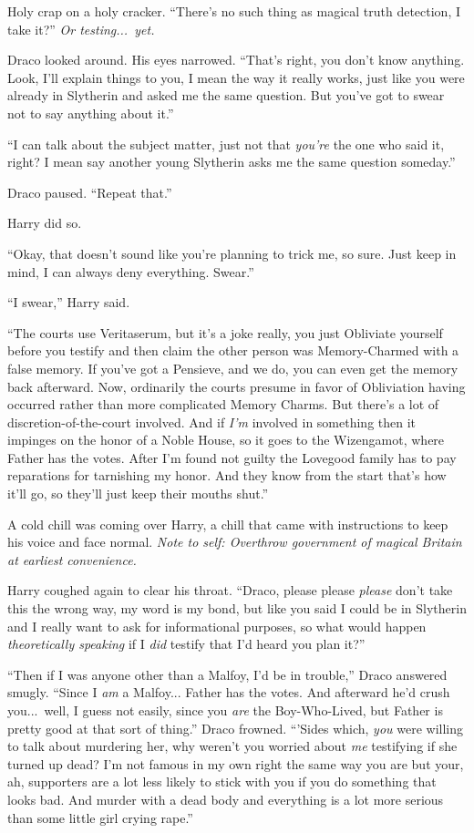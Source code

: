 Holy crap on a holy cracker. “There’s no such thing as magical truth detection, I take it?” \emph{Or  testing...\ yet.}

Draco looked around. His eyes narrowed. “That’s right, you don’t know anything. Look, I’ll explain things to you, I mean the way it really works, just like you were already in Slytherin and asked me the same question. But you’ve got to swear not to say anything about it.”

“I can talk about the subject matter, just not that \emph{you’re} the one who said it, right? I mean say another young Slytherin asks me the same question someday.”

Draco paused. “Repeat that.”

Harry did so.

“Okay, that doesn’t sound like you’re planning to trick me, so sure. Just keep in mind, I can always deny everything. Swear.”

“I swear,” Harry said.

“The courts use Veritaserum, but it’s a joke really, you just Obliviate yourself before you testify and then claim the other person was Memory-Charmed with a false memory. If you’ve got a Pensieve, and we do, you can even get the memory back afterward. Now, ordinarily the courts presume in favor of Obliviation having occurred rather than more complicated Memory Charms. But there’s a lot of discretion-of-the-court involved. And if \emph{I’m} involved in something then it impinges on the honor of a Noble House, so it goes to the Wizengamot, where Father has the votes. After I’m found not guilty the Lovegood family has to pay reparations for tarnishing my honor. And they know from the start that’s how it’ll go, so they’ll just keep their mouths shut.”

A cold chill was coming over Harry, a chill that came with instructions to keep his voice and face normal. \emph{Note to self: Overthrow government of magical Britain at earliest convenience.}

Harry coughed again to clear his throat. “Draco, please please \emph{please} don’t take this the wrong way, my word is my bond, but like you said I could be in Slytherin and I really want to ask for informational purposes, so what would happen \emph{theoretically speaking} if I \emph{did} testify that I’d heard you plan it?”

“Then if I was anyone other than a Malfoy, I’d be in trouble,” Draco answered smugly. “Since I \emph{am} a Malfoy... Father has the votes. And afterward he’d crush you...\ well, I guess not easily, since you \emph{are} the Boy-Who-Lived, but Father is pretty good at that sort of thing.” Draco frowned. “’Sides which, \emph{you} were willing to talk about murdering her, why weren’t you worried about \emph{me} testifying if she turned up dead? I’m not famous in my own right the same way you are but your, ah, supporters are a lot less likely to stick with you if you do something that looks bad. And murder with a dead body and everything is a lot more serious than some little girl crying rape.”

